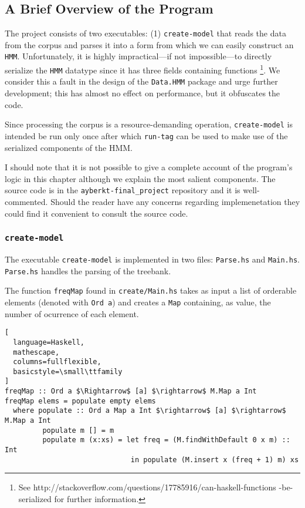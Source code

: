 \documentclass{article}
\begin{document}
\subsection{A Brief Overview of the Program}

The project consists of two executables: (1) \texttt{create-model} that reads
the data from the corpus and parses it into a form from which we can easily
construct an \texttt{HMM}. Unfortunately, it is highly impractical---if not
impossible---to directly serialize the \texttt{HMM} datatype since it has three
fields containing functions \footnote{See
  http://stackoverflow.com/questions/17785916/can-haskell-functions
  -be-serialized for further information.}. We consider this a fault in the
design of the \texttt{Data.HMM} package and urge further development; this has
almost no effect on performance, but it obfuscates the code.

Since processing the corpus is a resource-demanding operation,
\texttt{create-model} is intended be run only once after which \texttt{run-tag}
can be used to make use of the serialized components of the HMM.

I should note that it is not possible to give a complete account of the
program's logic in this chapter although we explain the most salient components.
The source code is in the \texttt{ayberkt-final_project} repository and it is
well-commented. Should the reader have any concerns regarding implemenetation
they could find it convenient to consult the source code.

\subsubsection{\texttt{create-model}}

The executable \texttt{create-model} is implemented in two files:
\texttt{Parse.hs} and \texttt{Main.hs}. \texttt{Parse.hs} handles the parsing of
the treebank.

The function \texttt{freqMap} found in \texttt{create/Main.hs} takes as input a
list of orderable elements (denoted with \texttt{Ord a}) and creates a
\texttt{Map} containing, as value, the number of ocurrence of each element.

\begin{lstlisting}[
  language=Haskell,
  mathescape,
  columns=fullflexible,
  basicstyle=\small\ttfamily
]
freqMap :: Ord a $\Rightarrow$ [a] $\rightarrow$ M.Map a Int
freqMap elems = populate empty elems
  where populate :: Ord a Map a Int $\rightarrow$ [a] $\rightarrow$ M.Map a Int
         populate m [] = m
         populate m (x:xs) = let freq = (M.findWithDefault 0 x m) :: Int
                              in populate (M.insert x (freq + 1) m) xs
\end{lstlisting}
\end{document}
